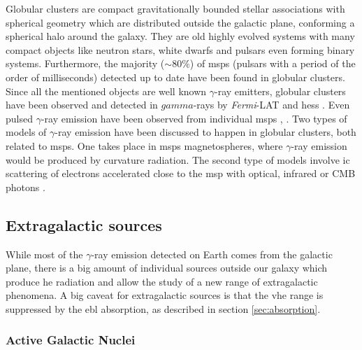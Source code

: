 \documentclass[main.tex]{subfiles}
\begin{document}
Globular clusters are compact gravitationally bounded stellar associations with spherical geometry which are distributed outside the galactic plane, conforming a spherical halo around the galaxy. They are old highly evolved systems with many compact objects like neutron stars, white dwarfs and pulsars even forming binary systems. Furthermore, the majority  ($\sim 80\%$) of \glspl{msp} (pulsars with a period of the order of milliseconds) detected up to date have been found in globular clusters.\\
Since all the mentioned objects are well known $\gamma$-ray emitters, globular clusters have been observed and  detected in $gamma$-rays by \textit{Fermi}-LAT \cite{2010globularclusterspopulationfermi} and \gls{hess}  \cite{2013globularclustersHESS}. Even pulsed $\gamma$-ray emission have been observed from individual \glspl{msp} \cite{2011detectionpulsationglobularcluster}, \cite{2013PulsedemissionfromGlobularM28}. 
Two types of models of $\gamma$-ray emission have been discussed to happen in globular clusters, both related to \glspl{msp}. One takes place in \glspl{msp} magnetospheres, where $\gamma$-ray emission would be produced by curvature radiation. The second type of models involve \gls{ic} scattering of electrons accelerated close to the \gls{msp} with optical, infrared or CMB photons \cite{2016GlobularClustersFermi}.  
\subsection{Extragalactic sources}

While most of the $\gamma$-ray emission detected on Earth comes from the galactic plane, there is a big amount of individual sources outside our galaxy which produce \gls{he} radiation and allow the study of a new range of extragalactic phenomena. A big caveat for extragalactic sources is that the \gls{vhe} range is suppressed by the \gls{ebl} absorption, as described in section \ref{sec:absorption}.

\subsubsection{Active Galactic Nuclei}
\end{document}
